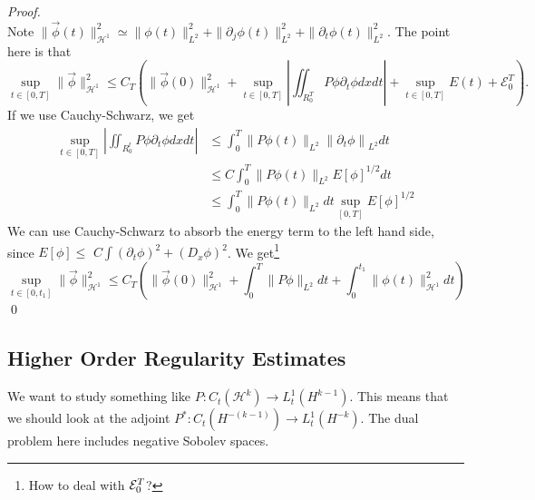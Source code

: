 \begin{proof}
$$$$
Note $\|\vec{\phi}(t)\|_{\mathcal{H}^{1}}^2 \simeq \|\phi(t)\|_{L^2}^2 + \|\partial_j \phi(t)\|_{L^2}^2 + \| \partial_t \phi (t)\|_{L^2}^2$.
The point here is that
$$
\sup _{t \in[0, T]}\|\vec{\phi}\|_{\mathcal{H}^{1}}^2\leq C_{T}\left(\|\vec{\phi}(0)\|_{\mathcal{H}^{1}}^{2}+\sup _{t \in[0, T]}\left|\iint_{R_{0}^{T}} P \phi \partial_{t} \phi d x d t\right|+\sup_{t\in [0,T]}E(t) + \mathcal{E}_{0}^{T}\right) .
$$
If we use Cauchy-Schwarz, we get
$$
\begin{aligned}
\sup _{t \in[0, T]}\left|\iint_{R_{0}^{t}} P \phi \partial_{t} \phi d x d t\right| & \leq \int_{0}^{T}\|P \phi(t)\|_{L^{2}}\left\|\partial_{t} \phi\right\|_{L^{2}} d t \\
& \leq C \int_{0}^{T}\|P \phi(t)\|_{L^{2}} E[\phi]^{1 / 2} d t \\
& \leq \int_{0}^{T}\|P \phi(t)\|_{L^{2}} d t \sup _{[0, T]} E[\phi]^{1 / 2}
\end{aligned}
$$
We can use Cauchy-Schwarz to absorb the energy term to the left hand side, since $E[\phi] \leq$ $C \int\left(\partial_{t} \phi\right)^{2}+\left(D_{x} \phi\right)^{2}$. We get\footnote{How to deal with $\mathcal{E}_0^T$?}
$$
\sup _{t \in\left[0, t_{1}\right]}\|\vec{\phi}\|_{\mathcal{H}^{1}}^{2} \leq C_{T}\left(\|\vec{\phi}(0)\|_{\mathcal{H}^{1}}^{2}+\int_{0}^{T}\|P \phi\|_{L^{2}} d t+\int_{0}^{t_{1}}\|\phi(t)\|_{\mathcal{H}^{1}}^{2} d t\right)
$$
\qed 
\end{proof}

\subsection{Higher Order Regularity Estimates}
We want to study something like $P: C_{t}\left(\mathcal{H}^{k}\right) \rightarrow L_{t}^{1}\left(H^{k-1}\right)$. This means that we should look at the adjoint $P^{*}: C_{t}\left(H^{-(k-1)}\right) \rightarrow L_{t}^{1}\left(H^{-k}\right)$. The dual problem here includes negative Sobolev spaces.

